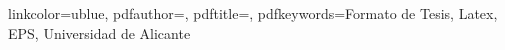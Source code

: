 \documentclass[paper=a4,10pt, Myfinal=true,twoside]{scrbook}
\begin{document}

\hypersetup
	{
 	linkcolor=ublue, %
	pdfauthor={\elautor},
	pdftitle={\eltitulo}, 
	pdfkeywords={Formato de Tesis, Latex, EPS, Universidad de Alicante}	
	 }

\frontmatter
{} %






\cleardoublepage
{}
\pagestyle{especial}
\tableofcontents
\end{document}
